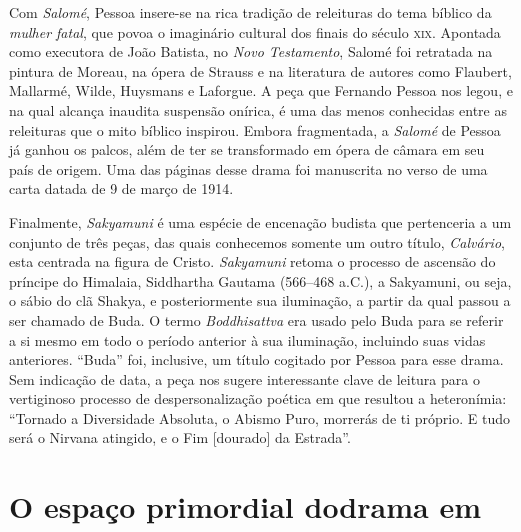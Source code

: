 Com \textit{Salomé}, Pessoa insere-se na rica tradição de releituras do
tema bíblico da \textit{mulher fatal}, que povoa o imaginário cultural
dos finais do século \textsc{xix}. Apontada como executora de João Batista, no
\textit{Novo Testamento}, Salomé foi retratada na pintura de Moreau, na
ópera de Strauss e na literatura de autores como Flaubert, Mallarmé,
Wilde, Huysmans e Laforgue. A peça que Fernando Pessoa nos legou, e na
qual alcança inaudita suspensão onírica, é uma das menos conhecidas
entre as releituras que o mito bíblico inspirou. Embora fragmentada, a
\textit{Salomé} de Pessoa já ganhou os palcos, além de ter se
transformado em ópera de câmara em seu país de
origem. Uma das páginas desse drama foi manuscrita no verso de uma carta
datada de 9 de março de 1914.

Finalmente, \textit{Sakyamuni} é uma
espécie de encenação budista que pertenceria a um conjunto de três
peças, das quais conhecemos somente um outro título, \textit{Calvário},
esta centrada na figura de Cristo. \textit{Sakyamuni} retoma o processo
de ascensão do príncipe do Himalaia, Siddhartha Gautama (566--468 a.C.),
a Sakyamuni, ou seja, o sábio do clã Shakya, e posteriormente sua
iluminação, a partir da qual passou a ser chamado de Buda. O termo
\textit{Boddhisattva} era usado pelo Buda para se referir a si mesmo em
todo o período anterior à sua iluminação, incluindo suas vidas
anteriores. “Buda” foi, inclusive, um título cogitado por Pessoa para
esse drama. Sem indicação de data, a peça nos sugere interessante clave de leitura para o
vertiginoso processo de despersonalização poética em que resultou a
heteronímia: “Tornado a Diversidade Absoluta, o Abismo Puro, morrerás
de ti próprio. E tudo será o Nirvana atingido, e o Fim [dourado] da
Estrada''.


\section{O espaço primordial do\break drama em }

